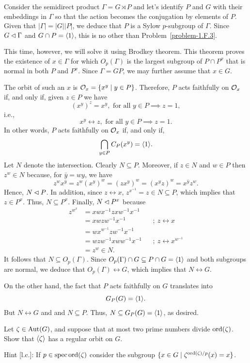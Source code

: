 \begin{solution} Consider the semidirect product $\Gamma=G\rtimes P$ and let's identify $P$ and $G$ with their embeddings in $\Gamma$ so that the action becomes the conjugation by elements of $P$. Given that $|\Gamma|=|G||P|$, we deduce that $P$ is a Sylow $p$-subgroup of $\Gamma$. Since $G\lhd\Gamma$ and $G\cap P=\langle1\rangle$, this is no other than Problem~\ref{problem-1.F.3}.

This time, however, we will solve it using Brodkey theorem. This theorem proves the existence of $x\in\Gamma$ for which $O_p(\Gamma)$ is the largest subgroup of $P\cap P^x$ that is normal in both $P$ and $P^x$. Since $\Gamma=GP$, we may further assume that $x\in G$.

The orbit of such an $x$ is ${\cal O}_x=\{x^y\mid y\in P\}$. Therefore, $P$ acts faithfully on ${\cal O}_x$ if, and only if, given $z\in P$ we have
$$
    (x^y)^z=x^y,\text{ for all }y\in P\implies z=1,
$$
i.e.,
$$
    x^y\leftrightarrow z,\text{ for all }y\in P\implies z=1.
$$
In other words, $P$ acts faithfully on ${\cal O}_x$ if, and only if,
$$
    \bigcap_{y\in P}C_P(x^y)=\langle1\rangle.
$$
Let $N$ denote the intersection. Clearly $N\subseteq P$. Moreover, if $z\in N$ and $w\in P$ then $z^w\in N$ because, for $\bar y=wy$, we have
$$
    z^wx^{\bar y} = z^w(x^y)^w = (zx^y)^w=(x^yz)^w = x^{\bar y}z^w.
$$
Hence, $N\lhd P$. In addition, since $z\leftrightarrow x$, $z^{x^{-1}}=z\in N\subseteq P$, which implies that $z\in P^x$. Thus, $N\subseteq P^x$. Finally, $N\lhd P^x$ because
\begin{align*}
    z^{w^x} &= xwx^{-1}zxw^{-1}x^{-1}\\
        &= xwzw^{-1}x^{-1}  &&;\ z\leftrightarrow x\\
        &= wx^{w^{-1}}zw^{-1}x^{-1}\\
        &= wzw^{-1}xww^{-1}x^{-1}   &&;\ z\leftrightarrow x^{w^{-1}}\\
        &= z^w \in N.
\end{align*}
It follows that $N\subseteq O_p(\Gamma)$. Since $O_p(\Gamma)\cap G\subseteq P\cap G=\langle1\rangle$ and both subgroups are normal, we deduce that $O_p(\Gamma)\leftrightarrow G$, which implies that $N\leftrightarrow G$.

On the other hand, the fact that $P$ acts faithfully on $G$ translates into
$$
    G_P(G)=\langle1\rangle.
$$
But $N\leftrightarrow G$ and and $N\subseteq P$. Thus, $N\subseteq G_P(G)=\langle1\rangle$, as desired.  \end{solution}

\begin{probl}
    Let\/ $\zeta\in{\rm Aut}(G)$, and suppose that at most two prime numbers divide\/ ${\rm ord}(\zeta)$. Show that\/ $\langle\zeta\rangle$ has a regular orbit on\/ $G$.

    \textrm{\upshape Hint [l.c.]: If $p\in\operatorname{spec}{\rm ord}(\zeta)$ consider the subgroup $\{x\in G\mid \zeta^{{\rm ord}(\zeta)/p}(x)=x\}$.}
\end{probl}

